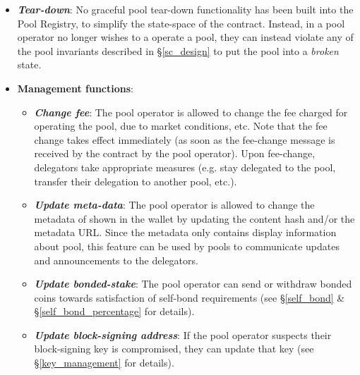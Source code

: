 \begin{itemize}
    \item \textbf{\textit{Tear-down}}: No graceful pool tear-down functionality has been built into the Pool Registry, to simplify the state-space of the contract. Instead, in a pool operator no longer wishes to a operate a pool, they can instead violate any of the pool invariants described in \S\ref{sc_design} to put the pool into a \textit{broken} state. 
    
    \item \textbf{Management functions}:
    \begin{itemize}
        \item \textbf{\textit{Change fee}}: The pool operator is allowed to change the fee charged for operating the pool, due to market conditions, etc. Note that the fee change takes effect immediately (as soon as the fee-change message is received by the contract by the pool operator). Upon fee-change, delegators take appropriate measures (e.g. stay delegated to the pool, transfer their delegation to another pool, etc.).
        \item \textbf{\textit{Update meta-data}}: The pool operator is allowed to change the metadata of shown in the wallet by updating the content hash and/or the metadata URL. Since the metadata only contains display information about pool, this feature can be used by pools to communicate updates and announcements to the delegators. 
        \item \textbf{\textit{Update bonded-stake}}: The pool operator can send or withdraw bonded coins towards satisfaction of self-bond requirements (see \S\ref{self_bond} \& \S\ref{self_bond_percentage} for details). 
        \item \textbf{\textit{Update block-signing address}}: If the pool operator suspects their block-signing key is compromised, they can update that  key (see \S\ref{key_management} for details). 
    \end{itemize}
\end{itemize}

